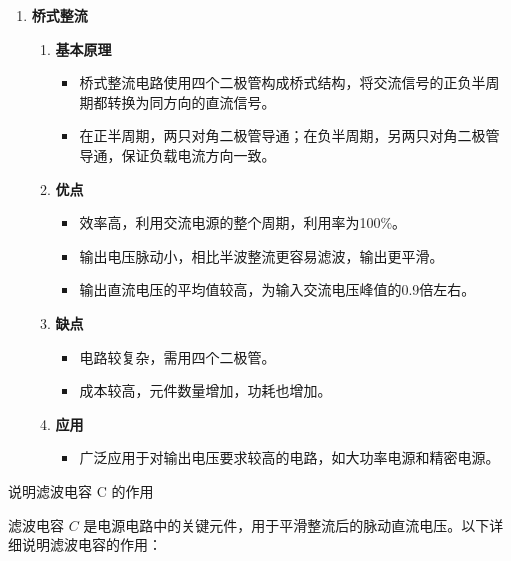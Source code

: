 \documentclass[dvipsnames, svgnames,a4paper,11pt]{article}
\begin{document}
\begin{enumerate}
			\item \textbf{桥式整流}
				\begin{enumerate}
					\item \textbf{基本原理}
						\begin{itemize}
							\item 桥式整流电路使用四个二极管构成桥式结构，将交流信号的正负半周期都转换为同方向的直流信号。
							\item 在正半周期，两只对角二极管导通；在负半周期，另两只对角二极管导通，保证负载电流方向一致。
						\end{itemize}
					\item \textbf{优点}
						\begin{itemize}
							\item 效率高，利用交流电源的整个周期，利用率为100\%。
							\item 输出电压脉动小，相比半波整流更容易滤波，输出更平滑。
							\item 输出直流电压的平均值较高，为输入交流电压峰值的0.9倍左右。
						\end{itemize}
					\item \textbf{缺点}
						\begin{itemize}
							\item 电路较复杂，需用四个二极管。
							\item 成本较高，元件数量增加，功耗也增加。
						\end{itemize}
					\item \textbf{应用}
						\begin{itemize}
							\item 广泛应用于对输出电压要求较高的电路，如大功率电源和精密电源。
						\end{itemize}
				\end{enumerate}
		\end{enumerate}



	\begin{question}
		说明滤波电容 C 的作用
	\end{question}

		滤波电容 \( C \) 是电源电路中的关键元件，用于平滑整流后的脉动直流电压。以下详细说明滤波电容的作用：
\end{document}
